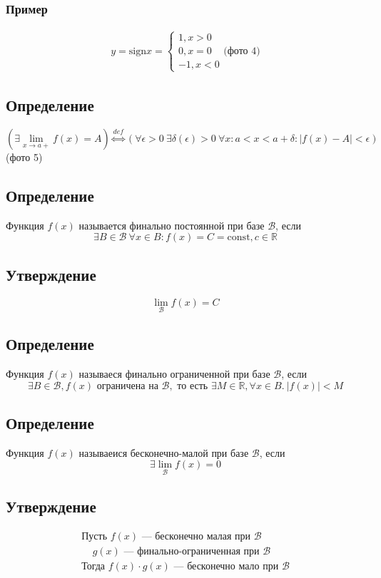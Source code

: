 \documentclass{article}
\begin{document}
\subsubsection{Пример}
\begin{gather*}
    y = \text{sign} x = 
    \begin{cases}
        1, x > 0 \\
        0, x = 0 \\
        -1, x < 0
    \end{cases}
    \text{(фото 4)}
\end{gather*}


\subsection{Определение}
\[
(\exists \lim_{x \to a+} f(x) = A) \overset{def}{\Leftrightarrow} (\forall \epsilon >0~\exists \delta(\epsilon) > 0~\forall x: a < x < a + \delta: |f(x) - A| < \epsilon)
\]
(фото 5)


\subsection{Определение}
Функция $f(x)$ называется финально постоянной при базе $\mathcal{B}$, если
\[
\exists B \in \mathcal{B}~\forall x \in B: f(x) = C = \text{const}, c \in \mathbb{R}
\]

\subsection{Утверждение}
\[
\lim_{\mathcal{B}} f(x) = C
\]

\subsection{Определение}
Функция $f(x)$ называеся финально ограниченной при базе $\mathcal{B}$, если
\[
\exists B \in \mathcal{B}, f(x) \text{ ограничена на } \mathcal{B}, \text{ то есть } \exists M \in \mathbb{R}, \forall x \in B.~|f(x)| < M
\]

\subsection{Определение}
Функция $f(x)$ называеися бесконечно-малой при базе $\mathcal{B}$, если
\[
\exists \lim_{\mathcal{B}} f(x) = 0
\]

\subsection{Утверждение}
\begin{gather*}
    \text{Пусть } f(x) \text{ --- бесконечно малая при } \mathcal{B} \\
    ~~~~~ g(x) \text{ --- финально-ограниченная при } \mathcal{B} \\
    \text{Тогда } f(x) \cdot g(x) \text{ --- бесконечно мало при } \mathcal{B} \\
\end{gather*}
\end{document}

